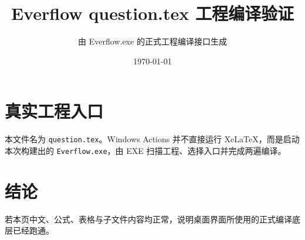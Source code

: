\documentclass[UTF8,a4paper,fontset=fandol]{ctexart}
\title{\textcolor{everflow}{Everflow question.tex 工程编译验证}}
\author{由 Everflow.exe 的正式工程编译接口生成}
\date{\today}
\begin{document}
\maketitle

\section*{真实工程入口}
本文件名为 \texttt{question.tex}。Windows Actions 并不直接运行 XeLaTeX，而是启动本次构建出的
\texttt{Everflow.exe}，由 EXE 扫描工程、选择入口并完成两遍编译。



\section*{结论}
若本页中文、公式、表格与子文件内容均正常，说明桌面界面所使用的正式编译底层已经跑通。
\end{document}
